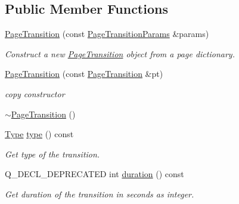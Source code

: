 \subsection*{Public Member Functions}
\begin{DoxyCompactItemize}
\item 
\hyperlink{class_poppler_1_1_page_transition_ab6ca077c24641b6ea0323ff1ec50b3e9}{Page\+Transition} (const \hyperlink{class_poppler_1_1_page_transition_params}{Page\+Transition\+Params} \&params)
\begin{DoxyCompactList}\small\item\em Construct a new \hyperlink{class_poppler_1_1_page_transition}{Page\+Transition} object from a page dictionary. \end{DoxyCompactList}\item 
\mbox{\label{class_poppler_1_1_page_transition_a26d8c1c3e4dbc14d0ba96c1912656939}} 
\hyperlink{class_poppler_1_1_page_transition_a26d8c1c3e4dbc14d0ba96c1912656939}{Page\+Transition} (const \hyperlink{class_poppler_1_1_page_transition}{Page\+Transition} \&pt)
\begin{DoxyCompactList}\small\item\em copy constructor \end{DoxyCompactList}\item 
\hyperlink{class_poppler_1_1_page_transition_a6a7dd3215cb63628a5a40e8082a5f89a}{$\sim$\+Page\+Transition} ()
\item 
\mbox{\label{class_poppler_1_1_page_transition_afa50c8a2529b89b9c100ecc826ce8c4c}} 
\hyperlink{class_poppler_1_1_page_transition_a2155276b5334c1cb5513531a45d7ab81}{Type} \hyperlink{class_poppler_1_1_page_transition_afa50c8a2529b89b9c100ecc826ce8c4c}{type} () const
\begin{DoxyCompactList}\small\item\em Get type of the transition. \end{DoxyCompactList}\item 
Q\+\_\+\+D\+E\+C\+L\+\_\+\+D\+E\+P\+R\+E\+C\+A\+T\+ED int \hyperlink{class_poppler_1_1_page_transition_a1e860a623563e2fa98b0ad5c96bf682b}{duration} () const
\begin{DoxyCompactList}\small\item\em Get duration of the transition in seconds as integer. \end{DoxyCompactList}\item 

\end{DoxyCompactItemize}
